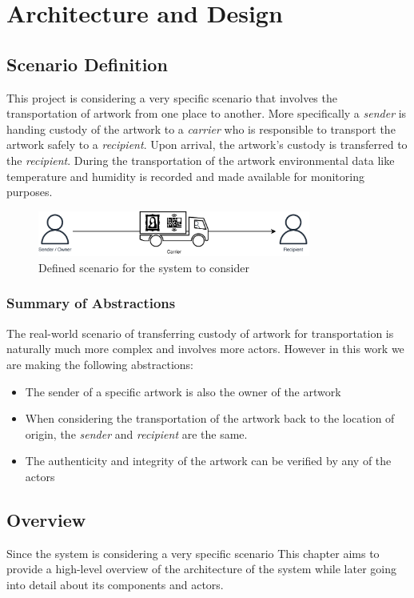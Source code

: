 \chapter{Architecture and Design}

\section{Scenario Definition}
\label{sec:scenario_definition}
This project is considering a very specific scenario that involves the transportation of artwork from one place to another. More specifically a \textit{sender} is handing custody of the artwork to a \textit{carrier} who is responsible to transport the artwork safely to a \textit{recipient}. Upon arrival, the artwork's custody is transferred to the \textit{recipient}. During the transportation of the artwork environmental data like temperature and humidity is recorded and made available for monitoring purposes.

\begin{figure}[ht]
    \centering
    \includegraphics[width=0.8\textwidth]{diagrams/Scenario.drawio.pdf}
    \caption{Defined scenario for the system to consider}
    \label{fig:scenario}
\end{figure}

\subsection*{Summary of Abstractions}
The real-world scenario of transferring custody of artwork for transportation is naturally much more complex and involves more actors. \cite{artintransit} However in this work we are making the following abstractions:
\begin{itemize}
    \item The sender of a specific artwork is also the owner of the artwork
    \item When considering the transportation of the artwork back to the location of origin, the \textit{sender} and \textit{recipient} are the same.
    \item The authenticity and integrity of the artwork can be verified by any of the actors
\end{itemize}

\section{Overview}
Since the system is considering a very specific scenario This chapter aims to provide a high-level overview of the architecture of the system while later going into detail about its components and actors.

